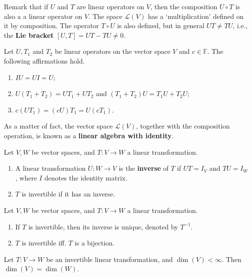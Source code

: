 Remark that if $U$ and $T$ are linear operators on $V$, then the composition $U \circ T$ is also a a linear operator on $V$. The space $\mathcal{L}(V)$ has a `multiplication' defined on it by composition. The operator $T \circ U$ is also defined, but in general $UT \neq TU$, i.e., the \textbf{Lie bracket} $[U, T] = UT - TU \neq 0$.

\begin{lemma}
	Let $U, T_1$ and $T_2$ be linear operators on the vector space $V$ and $c \in \mathbb{F}$. The following affirmations hold.
	\begin{enumerate}
		\item $IU = UI = U$;
		\item $U(T_1 + T_2) = UT_1 + UT_2$ and $(T_1 + T_2)U = T_1 U + T_2 U$;
		\item $c(UT_1) = (cU)T_1 = U(cT_1)$.
	\end{enumerate}
\end{lemma}

As a matter of fact, the vector space $\mathcal{L}(V)$, together with the composition operation, is known as a \textbf{linear algebra with identity}.

\begin{definition}[Invertibility]
	Let $V, W$ be vector spaces, and $T : V \longrightarrow W$ a linear transformation.
	\begin{enumerate}
		\item A linear transformation $U : W \longrightarrow V$ is the \textbf{inverse} of $T$ if $UT = I_V$ and $TU = I_W$, where $I$ denotes the identity matrix.
		\item $T$ is invertible if it has an inverse.
	\end{enumerate}
\end{definition}

\begin{theorem}
	Let $V, W$ be vector spaces, and $T : V \longrightarrow W$ a linear transformation.
	\begin{enumerate}
		\item If $T$ is invertible, then its inverse is unique, denoted by $T^{-1}$.
		\item $T$ is invertible iff. $T$ is a bijection.
	\end{enumerate}
\end{theorem}

\begin{lemma}
	Let $T : V \longrightarrow W$ be an invertible linear transformation, and $\dim(V) < \infty$. Then $\dim(V) = \dim(W)$.
\end{lemma}

